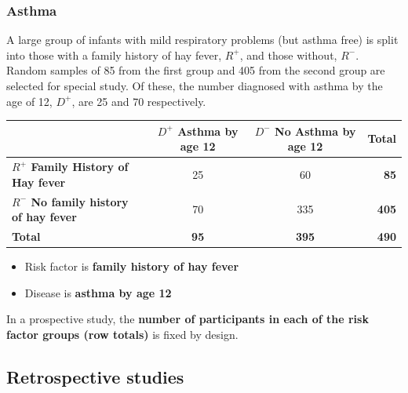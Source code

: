 \documentclass[a4paper]{article}\usepackage[]{graphicx}\usepackage[]{xcolor}
\begin{document}
\subsubsection{Asthma}
A large group of infants with mild respiratory problems (but asthma free) is split into those with a family history of hay fever, \textcolor{myred}{\( R^+ \)}, and those without, \textcolor{myred}{\( R^- \)}. Random samples of 85 from the first group and 405 from the second group are selected for special study. Of these, the number diagnosed with asthma by the age of 12, \textcolor{mygreen}{\( D^+ \)}, are 25 and 70 respectively.
\begin{table}[H]
	\centering
	\begin{tabular}{@{}lccr@{}}
	\toprule
				 														 & \textcolor{mygreen}{\textbf{\( D^+ \) Asthma by age 12}} & \textcolor{mygreen}{\textbf{\( D^- \) No Asthma by age 12}} & \textbf{Total}    \\ \midrule
	\textcolor{myred}{\textbf{\( R^+ \) Family History of Hay fever}}    & 25    		  											& 60        		                                          & \textcolor{myred}{\textbf{85}}  \\
	\textcolor{myred}{\textbf{\( R^- \) No family history of hay fever}} & 70    		  											& 335       		                                          & \textcolor{myred}{\textbf{405}} \\ \midrule
	\textbf{Total} 													     & \textbf{95}    											& \textbf{395}                                                & \textbf{490} \\ \bottomrule
	\end{tabular}
\end{table}
\begin{itemize}
	\item Risk factor is \textcolor{myred}{\textbf{family history of hay fever}}
	\item Disease is \textcolor{mygreen}{\textbf{asthma by age 12}}
\end{itemize}
\begin{goldbox}
	In a prospective study, the \textcolor{myred}{\textbf{number of participants in each of the risk factor groups (row totals)}} is fixed by design.
\end{goldbox}
\subsection{Retrospective studies}
\end{document}
